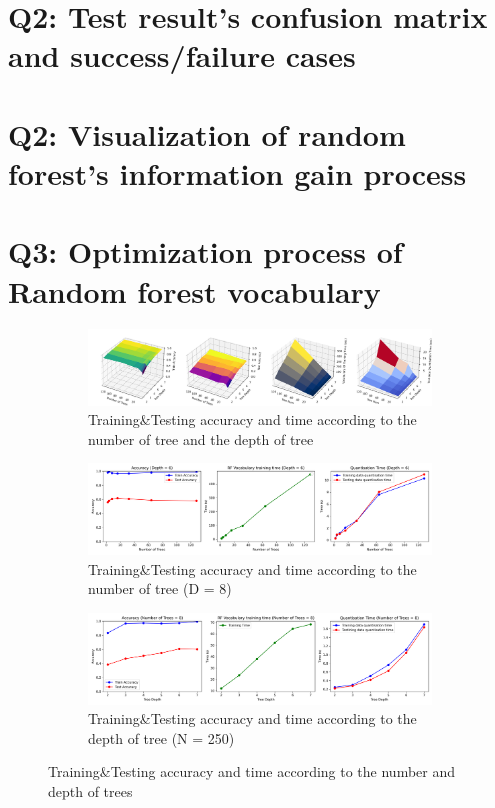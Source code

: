 \section{Q2: Test result's confusion matrix and success/failure cases}
\label{subsec:Q2-app1}

\section{Q2: Visualization of random forest's information gain process}
\label{subsec:Q2-app2}


\section{Q3: Optimization process of Random forest vocabulary}
\label{subsec:Q2-app3}
\begin{figure}[htbp]
	\centering
	\begin{subfigure}[H]{0.7\linewidth}
		\centering
		\includegraphics[width=\linewidth]{image/q3-fig1.png}
		\caption{Training\&Testing accuracy and time according to the number of tree and the depth of tree}
		\label{fig:q3-fig1}
	\end{subfigure}
	\begin{subfigure}[H]{0.7\linewidth}
		\centering
		\includegraphics[width=\linewidth]{image/q3-fig2.png}
		\caption{Training\&Testing accuracy and time according to the number of tree (D = 8)}
		\label{fig:q3-fig2}
	\end{subfigure}
	\begin{subfigure}[H]{0.7\linewidth}
		\centering
		\includegraphics[width=\linewidth]{image/q3-fig3.png}
		\caption{Training\&Testing accuracy and time according to the depth of tree (N = 250)}
		\label{fig:q3-fig3}
	\end{subfigure}
	\caption{Training\&Testing accuracy and time according to the number and depth of trees}
\end{figure}


